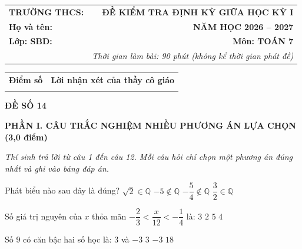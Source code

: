 \documentclass[12pt,a4paper]{article}
\begin{document}
\noindent
\begin{tabularx}{\linewidth}{X r}
\textbf{TRƯỜNG THCS: \dotfill} & \textbf{ĐỀ KIỂM TRA ĐỊNH KỲ GIỮA HỌC KỲ I} \\
\textbf{Họ và tên: \dotfill} & \textbf{NĂM HỌC 2026 -- 2027} \\
\textbf{Lớp: \dotfill \quad SBD: \dotfill} & \textbf{Môn: TOÁN 7} \\
& \textit{Thời gian làm bài: 90 phút (không kể thời gian phát đề)}
\end{tabularx}

\vspace{1mm}
\noindent
\begin{tabularx}{\linewidth}{|p{3.5cm}|X|}
\hline
\centering\textbf{Điểm số} & \centering\textbf{Lời nhận xét của thầy cô giáo} \tabularnewline
\rule{0pt}{0.8cm} & \\
\hline
\end{tabularx}

\vspace{1.5mm}
\begin{center}
\textbf{\large ĐỀ SỐ 14}
\end{center}

\noindent\textbf{\large PHẦN I. CÂU TRẮC NGHIỆM NHIỀU PHƯƠNG ÁN LỰA CHỌN (3,0 điểm)}

\textit{Thí sinh trả lời từ câu 1 đến câu 12. Mỗi câu hỏi chỉ chọn một phương án đúng nhất và ghi vào bảng đáp án.}

\vspace{1mm}
\begin{ex}
Phát biểu nào sau đây là đúng?
\choice
{$\sqrt{2} \in \mathbb{Q}$}
{$-5 \notin \mathbb{Q}$}
{$-\dfrac{5}{4} \notin \mathbb{Q}$}
{\True $\dfrac{3}{2} \in \mathbb{Q}$}
\end{ex}

\begin{ex}
Số giá trị nguyên của $x$ thỏa mãn $-\dfrac{2}{3} < \dfrac{x}{12} < -\dfrac{1}{4}$ là:
\choice
{$3$}
{$2$}
{$5$}
{\True $4$}
\end{ex}

\begin{ex}
Số $9$ có căn bậc hai số học là:
\choice
{$3$ và $-3$}
{\True $3$}
{$-3$}
{$18$}
\end{ex}

\begin{ex}
\end{ex}
\end{document}
